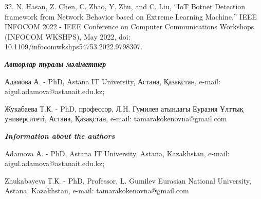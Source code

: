 32. N. Hasan, Z. Chen, C. Zhao, Y. Zhu, and C. Liu, ``IoT Botnet
Detection framework from Network Behavior based on Extreme Learning
Machine,'' IEEE INFOCOM 2022 - IEEE Conference on Computer
Communications Workshops (INFOCOM WKSHPS), May 2022, doi:
10.1109/infocomwkshps54753.2022.9798307.

\emph{{\bfseries Авторлар туралы мәліметтер}}

Адамова А. - PhD, Astana IT University, Астана, Қазақстан, e-mail:
aigul.adamova@astanait.edu.kz;

Жукабаева Т.К. - PhD, профессор, Л.Н. Гумилев атындағы Еуразия Ұлттық
университеті, Астана, Қазақстан, e-mail: tamarakokenovna@gmail.com

\emph{{\bfseries Information about the authors}}

Adamova А. - PhD, Astana IT University, Astana, Kazakhstan, e-mail:
aigul.adamova@astanait.edu.kz;

Zhukabayeva Т.К. - PhD, Professor, L. Gumilev Eurasian National
University, Astana, Kazakhstan, e-mail: tamarakokenovna@gmail.com





